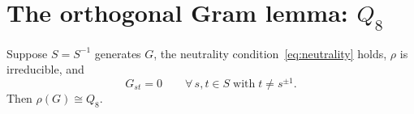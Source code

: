 \section{The orthogonal Gram lemma: $Q_8$}
  \label{sec:Q8}

  \begin{lemma}
    \label{lem:orth-implies-Q8}
    Suppose $S = S^{-1}$ generates $G$, the neutrality condition~\eqref{eq:neutrality}
    holds, $\rho$ is irreducible, and
    \begin{equation}
      G_{st} = 0
      \qquad \forall\, s, t \in S \;\text{with}\; t \neq s^{\pm 1}.
      \label{eq:orth-gram}
    \end{equation}
    Then $\rho(G) \cong Q_8$.
  \end{lemma}

